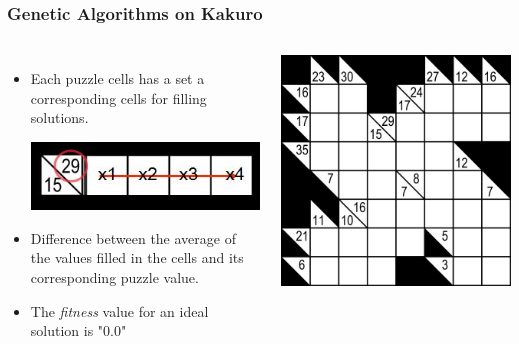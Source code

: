 \documentclass{beamer}
\begin{document}
			\begin{frame}
				\frametitle{Genetic Algorithms on Kakuro}
				\begin{columns}[c]
					\column{6cm}
					\begin{itemize}
						\item Each puzzle cells has a set a corresponding cells for filling solutions.\\
						\begin{center}
							\includegraphics[scale=0.4]{kakuroExample} 
						\end{center}
						\item Difference between the average of the values filled in the cells and its corresponding puzzle value.
						\item The {\it fitness} value for an ideal solution is "0.0"
					\end{itemize}

					\column{6cm}
					\includegraphics[scale=0.5]{kakuro} 
				\end{columns}
			\end{frame}
\end{document}
